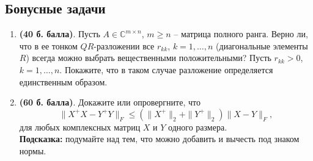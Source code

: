 \documentclass[a4paper, 11pt]{article}
\begin{document}
\subsection*{Бонусные задачи}
\begin{enumerate}
	\item \textbf{(40 б. балла)}. 
	Пусть $A\in\mathbb{C}^{m\times n}$, $m \geq n$ -- матрица полного ранга. Верно ли, что в ее тонком $QR$-разложении все $r_{kk}$, $k=1,\dots,n$ (диагональные элементы $R$) всегда можно выбрать вещественными положительными? Пусть $r_{kk}>0$, $k=1,\dots,n$. Покажите, что в таком случае разложение определяется единственным образом. 
	\item \textbf{(60 б. балла)}. 
	Докажите или опровергните, что 
	\[
	\|X^+X - Y^+ Y\|_F \leq \left( \|X^+\|_2 + \|Y^+\|_2 \right) \|X - Y\|_F,
	\]
	для любых комплексных матриц $X$ и $Y$ одного размера. \\
	\textbf{Подсказка:} подумайте над тем, что можно добавить и вычесть под знаком нормы.
\end{enumerate}
	
	
\end{document}
